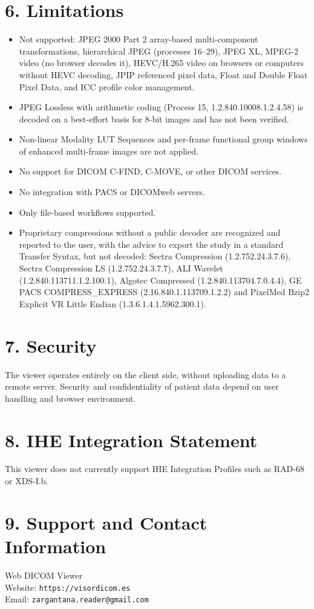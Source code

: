 \documentclass[11pt]{article}
\begin{document}
\section*{6. Limitations}

\begin{itemize}
  \item Not supported: JPEG 2000 Part 2 array-based multi-component transformations, hierarchical JPEG (processes 16--29), JPEG XL, MPEG-2 video (no browser decodes it), HEVC/H.265 video on browsers or computers without HEVC decoding, JPIP referenced pixel data, Float and Double Float Pixel Data, and ICC profile color management.
  \item JPEG Lossless with arithmetic coding (Process 15, 1.2.840.10008.1.2.4.58) is decoded on a best-effort basis for 8-bit images and has not been verified.
  \item Non-linear Modality LUT Sequences and per-frame functional group windows of enhanced multi-frame images are not applied.
  \item No support for DICOM C-FIND, C-MOVE, or other DICOM services.
  \item No integration with PACS or DICOMweb servers.
  \item Only file-based workflows supported.
  \item Proprietary compressions without a public decoder are recognized and reported to the user, with the advice to export the study in a standard Transfer Syntax, but not decoded: Sectra Compression (1.2.752.24.3.7.6), Sectra Compression LS (1.2.752.24.3.7.7), ALI Wavelet (1.2.840.113711.1.2.100.1), Algotec Compressed (1.2.840.113704.7.0.4.4), GE PACS COMPRESS\_EXPRESS (2.16.840.1.113709.1.2.2) and PixelMed Bzip2 Explicit VR Little Endian (1.3.6.1.4.1.5962.300.1).
\end{itemize}

\section*{7. Security}

The viewer operates entirely on the client side, without uploading data to a remote server. Security and confidentiality of patient data depend on user handling and browser environment.

\section*{8. IHE Integration Statement}

This viewer does not currently support IHE Integration Profiles such as RAD-68 or XDS-I.b.

\section*{9. Support and Contact Information}

Web DICOM Viewer \\
Website: \texttt{https://visordicom.es} \\
Email: \texttt{zargantana.reader@gmail.com}
\end{document}

